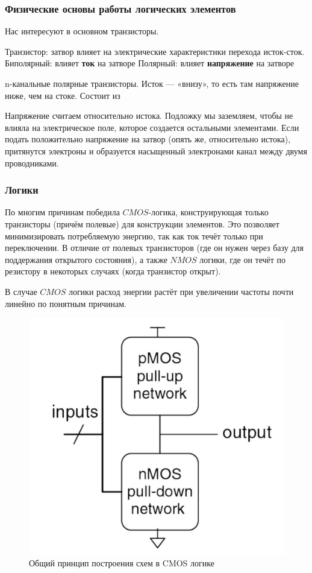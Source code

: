 \documentclass[12pt, a4paper]{article}
\begin{document}
\subsubsection{Физические основы работы логических элементов}

Нас интересуют в основном транзисторы.

Транзистор: затвор влияет на электрические характеристики перехода исток-сток.
Биполярный: влияет \textbf{ток} на затворе
Полярный: влияет \textbf{напряжение} на затворе

n-канальные полярные транзисторы. Исток — «внизу», то есть там напряжение ниже, чем на стоке. Состоит из 

Напряжение считаем относительно истока. 
Подложку мы заземляем, чтобы не влияла на электрическое поле, которое создается остальными элементами.
Если подать положительно напряжение на затвор (опять же, относительно истока), 
притянутся электроны и образуется насыщенный электронами канал между двумя проводниками.

\subsubsection{Логики}

По многим причинам победила $CMOS$-логика, конструирующая только транзисторы (причём полевые)
для конструкции элементов. Это позволяет минимизировать потребляемую энергию, так как ток течёт только при переключении.
В отличие от полевых транзисторов (где он нужен через базу для поддержания открытого состояния),
а также $NMOS$ логики, где он течёт по резистору в некоторых случаях (когда транзистор открыт).

В случае $CMOS$ логики расход энергии растёт при увеличении частоты почти линейно по понятным причинам.

\begin{figure}[h!]
    \centering
    \includegraphics[width=\textwidth]{images/general_cmos_element_scheme.png}
    \caption{Общий принцип построения схем в CMOS логике}
    \label{fig:cmos_general}
\end{figure}
\FloatBarrier
\end{document}
